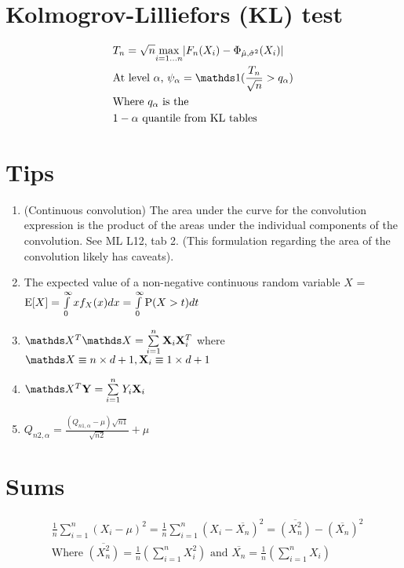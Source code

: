 \section {Kolmogrov-Lilliefors (KL) test}
\begin {equation} \begin {split}
& T_n = \sqrt{n} \underset{i = 1 \ldots n} {\max} \abs {F_n(X_i) - \Phi_{\hat \mu, \hat \sigma^2}(X_i)} \\
& \text {At level $\alpha$, } \psi_{\alpha}  = \ind{\frac {T_n}{\sqrt{n}} > q_{\alpha}} \\
& \text {Where $q_{\alpha}$ is the} \\
& \text {$1 - \alpha$ quantile from KL tables} \\
\end {split} \end {equation}

\section {Tips}
\begin {enumerate}
\item (Continuous convolution) The area under the curve for the convolution expression is the product of the areas under the individual components of the convolution. See ML L12, tab 2. (This formulation regarding the area of the convolution likely has caveats).
\item The expected value of a non-negative continuous random variable $X$ = $\mathrm{E}[X] = \int \limits_0^\infty x f_X(x) dx = \int \limits_0^\infty \mathrm{P} (X > t) dt$
\item $\mX^T \mX = \sum \limits_{i=1}^{n} \vX_i \vX_i^T$ where $\mX \equiv n \times d + 1, \vX_i \equiv 1 \times d + 1$
\item $\mX^T \vY = \sum \limits_{i=1}^{n} Y_i \vX_i$
\item $Q_{n2, \alpha} =  \frac {(Q_{n1, \alpha} - \mu) \sqrt{n1}} {\sqrt{n2}} + \mu$
\end {enumerate}

\section {Sums}
\begin {equation} \begin {split}
& \frac {1} {n} {\sum \limits_{i=1}^{n} (X_i - \mu)^2} = \frac {1} {n} {\sum \limits_{i=1}^{n} (X_i - \overline{X_n})^2} = \overline{(X_n^2)} - (\overline{X_n})^2  \\
& \text {Where } \overline{(X_n^2)} = \frac {1}{n} (\sum \limits_{i=1}^{n} X_i^2) \text { and } \overline{X_n} = \frac {1}{n} (\sum \limits_{i=1}^{n} X_i) \\
\end {split} \end {equation}

